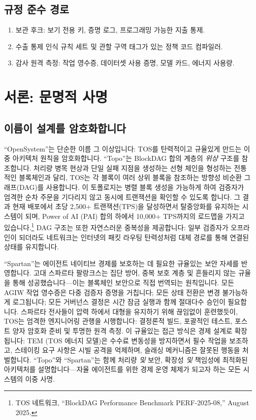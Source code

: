 \documentclass[11pt]{article}
\begin{document}
\subsection{규정 준수 경로}
\begin{enumerate}[noitemsep]
  \item 보관 후크: 보기 전용 키, 증명 로그, 프로그래밍 가능한 지출 통제.
  \item 수출 통제 인식 규칙 세트 및 관할 구역 태그가 있는 정책 코드 컴파일러.
  \item 감사 원격 측정: 작업 영수증, 데이터셋 사용 증명, 모델 카드, 에너지 사용량.
\end{enumerate}

\section{서론: 문명적 사명}
\subsection{이름이 설계를 암호화합니다}
``OpenSystem''는 단순한 이름 그 이상입니다: TOS를 탄력적이고 규율있게 만드는 이중 아키텍처 원칙을 암호화합니다. ``Topo''는 BlockDAG 합의 계층의 \emph{위상} 구조를 참조합니다. 처리량 병목 현상과 단일 실패 지점을 생성하는 선형 체인을 형성하는 전통적인 블록체인과 달리, TOS는 각 블록이 여러 상위 블록을 참조하는 방향성 비순환 그래프(DAG)를 사용합니다. 이 토폴로지는 병렬 블록 생성을 가능하게 하여 검증자가 엄격한 순차 주문을 기다리지 않고 동시에 트랜잭션을 확인할 수 있도록 합니다. 그 결과 현재 배포에서 초당 2,500+ 트랜잭션(TPS)을 달성하면서 탈중앙화를 유지하는 시스템이 되며, Power of AI (PAI) 합의 하에서 10,000+ TPS까지의 로드맵을 가지고 있습니다.\footnote{TOS 네트워크, ``BlockDAG Performance Benchmark PERF-2025-08,'' August 2025.} DAG 구조는 또한 자연스러운 중복성을 제공합니다: 일부 검증자가 오프라인이 되더라도 네트워크는 인터넷의 패킷 라우팅 탄력성처럼 대체 경로를 통해 연결된 상태를 유지합니다.

``Spartan''는 에이전트 네이티브 경제를 보호하는 데 필요한 규율있는 보안 자세를 반영합니다. 고대 스파르타 팔랑크스는 집단 방어, 중복 보호 계층 및 흔들리지 않는 규율을 통해 성공했습니다---이는 블록체인 보안으로 직접 번역되는 원칙입니다. 모든 AGIW 작업 영수증은 다중 검증자 증명을 거칩니다; 모든 상태 전환은 변경 불가능하게 로그됩니다; 모든 거버넌스 결정은 시간 잠금 실행과 함께 절대다수 승인이 필요합니다. 스파르타 전사들이 압력 하에서 대형을 유지하기 위해 끊임없이 훈련했듯이, TOS는 엄격한 엔지니어링 관행을 시행합니다: 결정론적 빌드, 포괄적인 테스트, 포스트 양자 암호화 준비 및 투명한 원격 측정. 이 규율있는 접근 방식은 경제 설계로 확장됩니다: TEM (TOS 에너지 모델)은 수수료 변동성을 방지하면서 필수 작업을 보조하고, 스테이킹 요구 사항은 시빌 공격을 억제하며, 슬래싱 메커니즘은 잘못된 행동을 처벌합니다. ``Topo''와 ``Spartan''는 함께 처리량 \emph{및} 보안, 확장성 \emph{및} 책임성에 최적화된 아키텍처를 설명합니다---자율 에이전트를 위한 경제 운영 체제가 되고자 하는 모든 시스템의 이중 사명.
\end{document}
